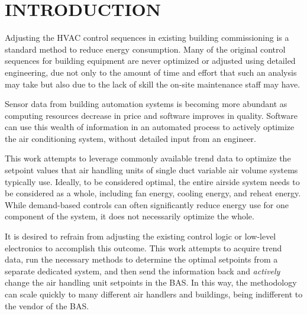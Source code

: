%
%
%



\pagestyle{plain} %
\setcounter{page}{1}


\chapter{\texorpdfstring{\MakeUppercase{Introduction}}{Introduction}} 
Adjusting the HVAC control sequences in existing building commissioning
is a standard method to reduce energy consumption. Many of the original
control sequences for building equipment are never optimized or adjusted
using detailed engineering, due not only to the amount of time and
effort that such an analysis may take but also due to the lack of skill
the on-site maintenance staff may have. 

Sensor data from building automation systems is becoming more abundant as
computing resources decrease in price and software improves in quality.
Software can use this wealth of information in an automated process to actively
optimize the air conditioning system, without detailed input from an engineer. 

This work attempts to leverage commonly available trend data to optimize the
setpoint values that air handling units of single duct variable air volume
systems typically use. Ideally, to be considered optimal, the entire airside
system needs to be considered as a whole, including fan energy, cooling energy,
and reheat energy. While demand-based controls can often significantly reduce
energy use for one component of the system, it does not necessarily optimize
the whole. 

It is desired to refrain from adjusting the existing control logic or low-level
electronics to accomplish this outcome. This work attempts to acquire trend
data, run the necessary methods to determine the optimal setpoints from a
separate dedicated system, and then send the information back and
\textit{actively} change the air handling unit setpoints in the BAS. In this
way, the methodology can scale quickly to many different air handlers and
buildings, being indifferent to the vendor of the BAS.
